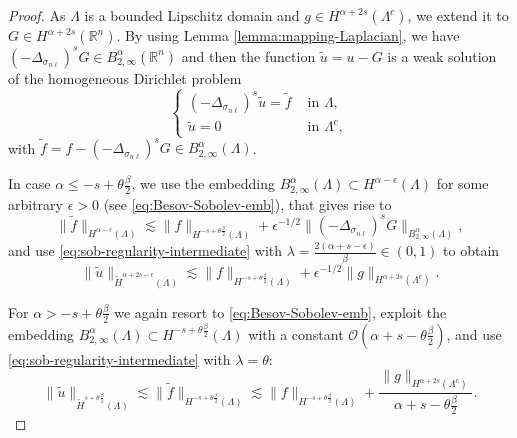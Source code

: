 \documentclass[10pt,a4paper]{amsart}
\def\R{{\mathbb R}}
\newcommand{\domain}{\Lambda}
\newcommand{\snl}{{\sigma_{n\ell}}}
\begin{document}
\begin{proof}
As  $\domain$ is a bounded Lipschitz domain and $g \in H^{\alpha+2s}(\domain^c)$, we extend it to $G \in H^{\alpha+2s}(\R^n)$. By using Lemma \ref{lemma:mapping-Laplacian}, we have $(-\Delta_\snl)^s G \in B^{\alpha}_{2,\infty}(\R^n)$ and then the function $\tilde u = u - G$ is a weak solution of the homogeneous Dirichlet problem
\[
 \left\lbrace \begin{aligned}
(-\Delta_\snl)^s \tilde u = \tilde f & \mbox{ in } \domain, \\
\tilde u = 0 & \mbox{ in } \domain^c,
\end{aligned} \right.
\]
with $\tilde f =  f  - (-\Delta_\snl)^s G \in B^{\alpha}_{2,\infty}(\domain)$. 

In case $\alpha \le -s + \theta \frac\beta{2}$, we use the embedding $B^{\alpha}_{2,\infty}(\domain) \subset H^{\alpha -\epsilon}(\domain)$ for some arbitrary $\epsilon > 0$ (see \eqref{eq:Besov-Sobolev-emb}), that gives rise to 
\[
\| \tilde f  \|_{H^{\alpha -\epsilon}(\domain)} \lesssim \| f  \|_{H^{-s + \theta \frac\beta{2}}(\domain)} + \epsilon^{-1/2} \| (-\Delta_\snl)^s G \|_{B^{\alpha}_{2,\infty}(\domain)},
\]
and use \eqref{eq:sob-regularity-intermediate} with $\lambda = \frac{2(\alpha+s-\epsilon)}\beta \in (0,1)$ to obtain
\[
  \| \tilde u \|_{\widetilde{H}^{\alpha +2s - \epsilon}(\domain)} \lesssim  \| f  \|_{H^{-s + \theta \frac\beta{2}}(\domain)} + \epsilon^{-1/2} \| g \|_{H^{\alpha+2s} (\domain^c)} .
\]

For $\alpha > -s + \theta \frac\beta2$ we again resort to \eqref{eq:Besov-Sobolev-emb}, exploit the embedding $B^{\alpha}_{2,\infty}(\domain) \subset H^{-s+\theta\frac\beta2}(\domain)$ 
with a constant $\mathcal{O}(\alpha+s-\theta\frac\beta2)$,
and  use \eqref{eq:sob-regularity-intermediate} with $\lambda = \theta$:
\[
  \| \tilde u \|_{\widetilde H^{s+\theta \frac\beta2}(\domain)} \lesssim  \| \tilde f  \|_{H^{-s+\theta\frac\beta2}(\domain)} \lesssim  
  \| f  \|_{H^{-s+\theta\frac\beta2}(\domain)} + \frac{ \| g \|_{H^{\alpha+2s} (\domain^c)}}{\alpha+s-\theta\frac\beta2} .
\]
\end{proof}
\end{document}
